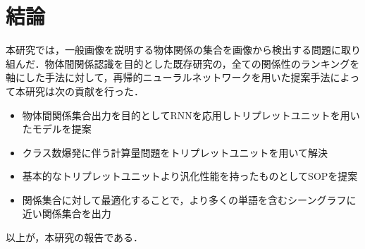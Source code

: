 \section{結論}

本研究では，一般画像を説明する物体関係の集合を画像から検出する問題に取り組んだ．物体間関係認識を目的とした既存研究の，全ての関係性のランキングを軸にした手法に対して，再帰的ニューラルネットワークを用いた提案手法によって本研究は次の貢献を行った．
	\begin{itemize}
		\item 物体間関係集合出力を目的としてRNNを応用しトリプレットユニットを用いたモデルを提案
		\item クラス数爆発に伴う計算量問題をトリプレットユニットを用いて解決
		\item 基本的なトリプレットユニットより汎化性能を持ったものとしてSOPを提案
		\item 関係集合に対して最適化することで，より多くの単語を含むシーングラフに近い関係集合を出力
	\end{itemize}

以上が，本研究の報告である．






